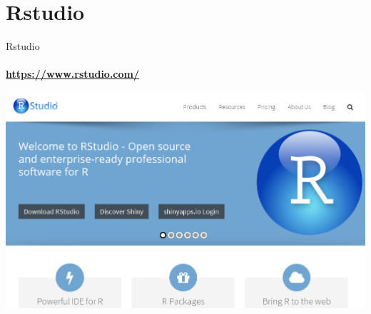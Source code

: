 \documentclass[12pt]{beamer}
\begin{document}
\section{Rstudio}
\begin{frame}{Rstudio}
\framesubtitle{\url{https://www.rstudio.com/}}
\begin{center}
\href{https://www.rstudio.com/}{\includegraphics[scale=0.35]{images/image5}}
\end{center}
\end{frame}
\end{document}
